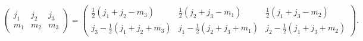 \[\begin{pmatrix}j_{1}&j_{2}&j_{3}\\
m_{1}&m_{2}&m_{3}\end{pmatrix}=\begin{pmatrix}\frac{1}{2}(j_{1}+j_{2}-m_{3})&%
\frac{1}{2}(j_{2}+j_{3}-m_{1})&\frac{1}{2}(j_{1}+j_{3}-m_{2})\\
j_{3}-\frac{1}{2}(j_{1}+j_{2}+m_{3})&j_{1}-\frac{1}{2}(j_{2}+j_{3}+m_{1})&j_{2%
}-\frac{1}{2}(j_{1}+j_{3}+m_{2})\end{pmatrix}.\]